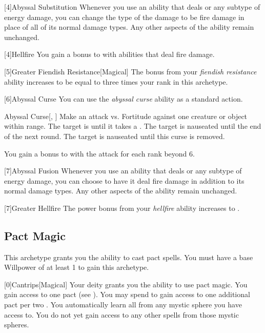         [4]{Abyssal Substitution} Whenever you use an ability that deals  or any subtype of energy damage, you can change the type of the damage to be fire damage in place of all of its normal damage types.
        Any other aspects of the ability remain unchanged.

        [4]{Hellfire} You gain a  bonus to  with abilities that deal fire damage.

        [5]{Greater Fiendish Resistance}[Magical] The bonus from your \textit{fiendish resistance} ability increases to be equal to three times your rank in this archetype.

        [6]{Abyssal Curse} You can use the \textit{abyssal curse} ability as a standard action.
        \begin{freeability}{Abyssal Curse}[, ]
            Make an attack vs. Fortitude against one creature or object within \rngmed range.
            \hit The target is  until it takes a .
            \glance The target is nauseated until the end of the next round.
            \crit The target is nauseated until this curse is removed.

            \rankline
            You gain a  bonus to  with the attack for each rank beyond 6.
        \end{freeability}

        [7]{Abyssal Fusion} Whenever you use an ability that deals  or any subtype of energy damage, you can choose to have it deal fire damage in addition to its normal damage types.
        Any other aspects of the ability remain unchanged.

        [7]{Greater Hellfire} The power bonus from your \textit{hellfire} ability increases to .

    \newpage
    \subsection{Pact Magic}
        This archetype grants you the ability to cast pact spells.
        You must have a base Willpower of at least 1 to gain this archetype.

        [0]{Cantrips}[Magical]
        Your deity grants you the ability to use pact magic.
        You gain access to one pact  (see ).
        You may spend  to gain access to one additional pact  per two .
        You automatically learn all  from any mystic sphere you have access to.
        You do not yet gain access to any other spells from those mystic spheres.

